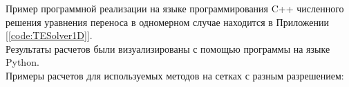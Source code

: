\documentclass[12pt,a4paper]{article}
\begin{document}
Пример программной реализации на языке программирования C++ численного решения уравнения переноса в одномерном случае находится в Приложении [\ref{code:TESolver1D}].\\
Результаты расчетов были визуализированы с помощью программы на языке Python.\\
Примеры расчетов для используемых методов на сетках с разным разрешением:
\\
\end{document}

